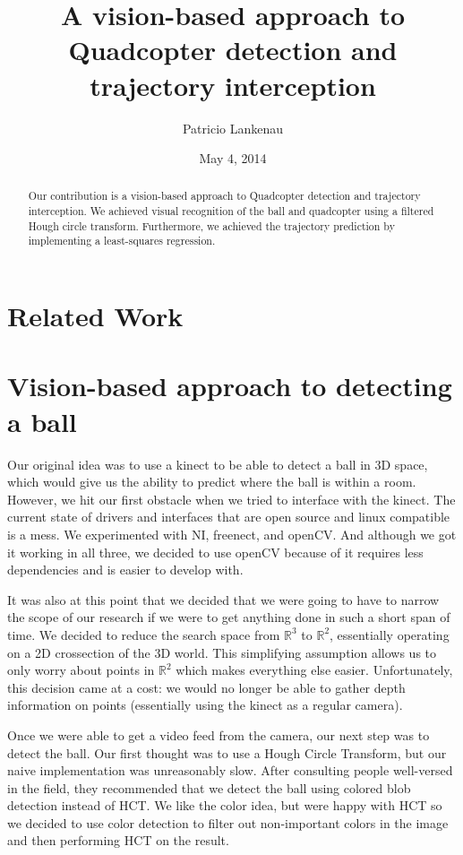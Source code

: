 \documentclass{article}
\title{A vision-based approach to Quadcopter detection and trajectory interception}
\author{Patricio Lankenau}
\date{May 4, 2014}
\begin{document}
\maketitle

\begin{abstract}
Our contribution is a vision-based approach to Quadcopter detection and trajectory interception.
We achieved visual recognition of the ball and quadcopter using a filtered Hough circle transform.
Furthermore, we achieved the trajectory prediction by implementing a least-squares regression.
\end{abstract}

\section{Related Work}

\section{Vision-based approach to detecting a ball}

Our original idea was to use a kinect to be able to detect a ball in 3D space, which would give
us the ability to predict where the ball is within a room. However, we hit our first obstacle
when we tried to interface with the kinect. The current state of drivers and interfaces that
are open source and linux compatible is a mess. We experimented with NI, freenect, and openCV\@.
And although we got it working in all three, we decided to use openCV because of it requires less
dependencies and is easier to develop with.

It was also at this point that we decided that we were going to have to narrow the scope of our
research if we were to get anything done in such a short span of time. We decided to reduce the
search space from $\mathbb{R}^3$ to $\mathbb{R}^2$, essentially operating on a 2D crossection of
the 3D world. This simplifying assumption allows us to only worry about points in $\mathbb{R}^2$
which makes everything else easier. Unfortunately, this decision came at a cost: we would no
longer be able to gather depth information on points (essentially using the kinect as a regular
camera). 

Once we were able to get a video feed from the camera, our next step was to detect the ball. Our
first thought was to use a Hough Circle Transform, but our naive implementation was unreasonably
slow. After consulting people well-versed in the field, they recommended that we detect the ball
using colored blob detection instead of HCT\@. We like the color idea, but were happy with HCT so
we decided to use color detection to filter out non-important colors in the image and then
performing HCT on the result.
\end{document}
